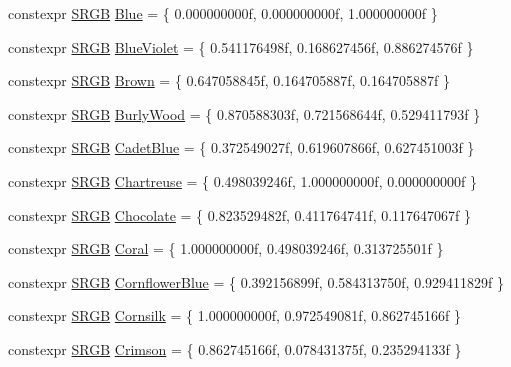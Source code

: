 \begin{DoxyCompactItemize}
\item 
constexpr \hyperlink{structmage_1_1_s_r_g_b}{S\+R\+GB} \hyperlink{namespacemage_1_1color_a8b0d8d20e1a27b4ccb8f3c6763c7e3d3}{Blue} = \{ 0.\+000000000f, 0.\+000000000f, 1.\+000000000f \}
\item 
constexpr \hyperlink{structmage_1_1_s_r_g_b}{S\+R\+GB} \hyperlink{namespacemage_1_1color_ad8b10d4a3479f7dcd825ec304f23fa2f}{Blue\+Violet} = \{ 0.\+541176498f, 0.\+168627456f, 0.\+886274576f \}
\item 
constexpr \hyperlink{structmage_1_1_s_r_g_b}{S\+R\+GB} \hyperlink{namespacemage_1_1color_aa05e52edf0ad1dcfea8ff43e664ac0c9}{Brown} = \{ 0.\+647058845f, 0.\+164705887f, 0.\+164705887f \}
\item 
constexpr \hyperlink{structmage_1_1_s_r_g_b}{S\+R\+GB} \hyperlink{namespacemage_1_1color_a3e345567ebc754dcb87fc0793a8e0a79}{Burly\+Wood} = \{ 0.\+870588303f, 0.\+721568644f, 0.\+529411793f \}
\item 
constexpr \hyperlink{structmage_1_1_s_r_g_b}{S\+R\+GB} \hyperlink{namespacemage_1_1color_a151445e7b496cce9be10d88db7014efb}{Cadet\+Blue} = \{ 0.\+372549027f, 0.\+619607866f, 0.\+627451003f \}
\item 
constexpr \hyperlink{structmage_1_1_s_r_g_b}{S\+R\+GB} \hyperlink{namespacemage_1_1color_a8fa383463cb5d6a0ab8c60417b450c95}{Chartreuse} = \{ 0.\+498039246f, 1.\+000000000f, 0.\+000000000f \}
\item 
constexpr \hyperlink{structmage_1_1_s_r_g_b}{S\+R\+GB} \hyperlink{namespacemage_1_1color_a8866568c3674281524c92453d7877efd}{Chocolate} = \{ 0.\+823529482f, 0.\+411764741f, 0.\+117647067f \}
\item 
constexpr \hyperlink{structmage_1_1_s_r_g_b}{S\+R\+GB} \hyperlink{namespacemage_1_1color_ae8c9a8b1962f0827ff8e859efbe8400d}{Coral} = \{ 1.\+000000000f, 0.\+498039246f, 0.\+313725501f \}
\item 
constexpr \hyperlink{structmage_1_1_s_r_g_b}{S\+R\+GB} \hyperlink{namespacemage_1_1color_a1591cd32f7c5dd154d48f4cb0d1627b5}{Cornflower\+Blue} = \{ 0.\+392156899f, 0.\+584313750f, 0.\+929411829f \}
\item 
constexpr \hyperlink{structmage_1_1_s_r_g_b}{S\+R\+GB} \hyperlink{namespacemage_1_1color_a24e0d8991b0be88d7e9bb77c4a5c0d7b}{Cornsilk} = \{ 1.\+000000000f, 0.\+972549081f, 0.\+862745166f \}
\item 
constexpr \hyperlink{structmage_1_1_s_r_g_b}{S\+R\+GB} \hyperlink{namespacemage_1_1color_a8114d6760627759ba375d672d57e8586}{Crimson} = \{ 0.\+862745166f, 0.\+078431375f, 0.\+235294133f \}

\end{DoxyCompactItemize}
